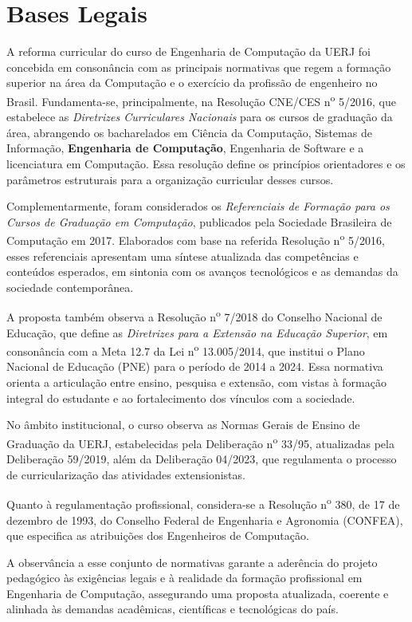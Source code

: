\chapter{Bases Legais}

A reforma curricular do curso de Engenharia de Computação da UERJ foi concebida em consonância com as principais normativas que regem a formação superior na área da Computação e o exercício da profissão de engenheiro no Brasil. Fundamenta-se, principalmente, na Resolução CNE/CES n\textsuperscript{o} 5/2016, que estabelece as \textit{Diretrizes Curriculares Nacionais} para os cursos de graduação da área, abrangendo os bacharelados em Ciência da Computação, Sistemas de Informação, \textbf{Engenharia de Computação}, Engenharia de Software e a licenciatura em Computação. Essa resolução define os princípios orientadores e os parâmetros estruturais para a organização curricular desses cursos.

Complementarmente, foram considerados os \textit{Referenciais de Formação para os Cursos de Graduação em Computação}, publicados pela Sociedade Brasileira de Computação em 2017. Elaborados com base na referida Resolução n\textsuperscript{o}  5/2016, esses referenciais apresentam uma síntese atualizada das competências e conteúdos esperados, em sintonia com os avanços tecnológicos e as demandas da sociedade contemporânea.

A proposta também observa a Resolução n\textsuperscript{o} 7/2018 do Conselho Nacional de Educação, que define as \textit{Diretrizes para a Extensão na Educação Superior}, em consonância com a Meta 12.7 da Lei n\textsuperscript{o} 13.005/2014, que institui o Plano Nacional de Educação (PNE) para o período de 2014 a 2024. Essa normativa orienta a articulação entre ensino, pesquisa e extensão, com vistas à formação integral do estudante e ao fortalecimento dos vínculos com a sociedade.

No âmbito institucional, o curso observa as Normas Gerais de Ensino de Graduação da UERJ, estabelecidas pela Deliberação n\textsuperscript{o} 33/95, atualizadas pela Deliberação  59/2019, além da Deliberação  04/2023, que regulamenta o processo de curricularização das atividades extensionistas.

Quanto à regulamentação profissional, considera-se a Resolução n\textsuperscript{o} 380, de 17 de dezembro de 1993, do Conselho Federal de Engenharia e Agronomia (CONFEA), que especifica as atribuições dos Engenheiros de Computação.

A observância a esse conjunto de normativas garante a aderência do projeto pedagógico às exigências legais e à realidade da formação profissional em Engenharia de Computação, assegurando uma proposta atualizada, coerente e alinhada às demandas acadêmicas, científicas e tecnológicas do país.

